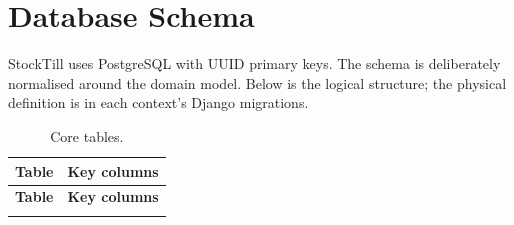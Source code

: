 \documentclass[11pt,a4paper]{article}
\begin{document}
\section{Database Schema}
\label{sec:schema}

StockTill uses PostgreSQL with UUID primary keys. The schema is deliberately normalised around the
domain model. Below is the logical structure; the physical definition is in each context's Django
migrations.

\begin{longtable}{@{}p{}p{}@{}}
\caption{Core tables.}\\
\toprule
\textbf{Table} & \textbf{Key columns} \\
\midrule
\endfirsthead
\toprule
\textbf{Table} & \textbf{Key columns} \\
\midrule
\endhead
\bottomrule
\endfoot


\end{longtable}
\end{document}
